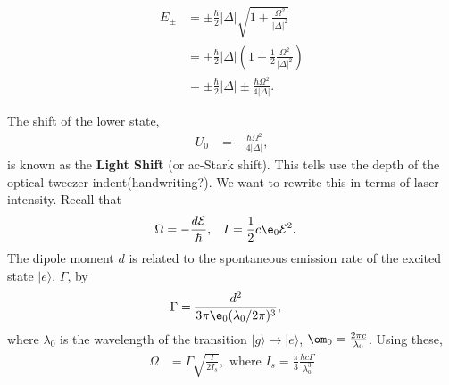 \documentclass[lasers.tex]{subfiles}
\begin{document}
\begin{multicols}{2}
\begin{figure}[H]
    \centering
\end{figure}
\columnbreak
\begin{align}
    E_\pm &= \pm\frac{\hbar}{2}|\Delta|\sqrt{1+\frac{\Omega^2}{|\Delta|^2}} \\
          &= \pm\frac{\hbar}{2}|\Delta|\left(1+\frac12\frac{\Omega^2}{|\Delta|^2}\right) \\
          &= \pm\frac{\hbar}{2}|\Delta|\pm \frac{\hbar\Omega^2}{4|\Delta|}.
\end{align}
\end{multicols}
The shift of the lower state, 
\begin{align}
    U_0 &= -\frac{\hbar\Omega^2}{4|\Delta|},
\end{align}
is known as the \textbf{Light Shift} (or ac-Stark shift).
This tells use the depth of the optical tweezer indent(handwriting?). 
We want to rewrite this in terms of laser intensity. 
Recall that
\begin{align}
    \Omega &= -\frac{d\mathcal{E}}{\hbar}, & I &= \frac12 c\e_0\mathcal{E}^2.
\end{align}
The dipole moment $d$ is related to the spontaneous emission rate of the excited state $|e\rangle$, $\Gamma$, by
\begin{align}
    \Gamma &= \frac{d^2}{3\pi\e_0(\lambda_0/2\pi)^3},
\end{align}
where $\lambda_0$ is the wavelength of the transition $|g\rangle\to|e\rangle$, $\om_0=\frac{2\pi c}{\lambda_0}$.
Using these, 
\begin{align}
    \Omega &= \Gamma\sqrt{\frac{I}{2I_s}}, \text{ where } I_s = \frac{\pi}{3}\frac{hc\Gamma}{\lambda_0^3}
\end{align}
\end{document}
